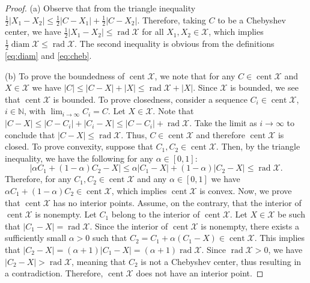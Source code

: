 \documentclass[pdflatex,sn-mathphys-num]{sn-jnl}%
\DeclareMathOperator{\rad}{rad}
\DeclareMathOperator{\cent}{cent}
\DeclareMathOperator{\diam}{diam}
\newcommand{\norm}[1]{\left|#1\right|}
\theoremstyle{thmstyleone}
\begin{document}
\begin{proof}
(a) Observe that from the triangle inequality $\tfrac{1}{2}\norm{X_1-X_2}\leq \tfrac{1}{2}\norm{C-X_1}+\tfrac{1}{2}\norm{C-X_2}$. Therefore, taking $C$ to be a Chebyshev center, we have $\tfrac{1}{2}\norm{X_1-X_2}\leq \rad\mathcal{X}$ for all \mbox{$X_1,X_2\in\mathcal{X}$}, which implies $\tfrac{1}{2}\diam\mathcal{X}\leq\rad\mathcal{X}$. The second inequality is obvious from the definitions \eqref{eq:diam} and \eqref{eq:cheb}. 

(b) To prove the boundedness of $\cent\mathcal{X}$, we note that for any $C\in\cent\mathcal{X}$ and $X\in\mathcal{X}$ we have $\norm{C}\leq \norm{C-X}+\norm{X}\leq \rad\mathcal{X}+\norm{X}$. Since $\mathcal{X}$ is bounded, we see that $\cent\mathcal{X}$ is bounded. To prove closedness, consider a sequence $C_i\in\cent\mathcal{X}$, $i\in\mathbb{N}$, with $\lim_{i\rightarrow\infty} C_i=C$. Let $X\in\mathcal{X}$. Note that $\norm{C-X}\leq\norm{C-C_i}+\norm{C_i-X}\leq \norm{C-C_i}+\rad\mathcal{X}$. Take the limit as $i\rightarrow \infty$ to conclude that $\norm{C-X}\leq \rad\mathcal{X}$. Thus, $C\in\cent\mathcal{X}$ and therefore $\cent\mathcal{X}$ is closed. 
To prove convexity, suppose that $C_1,C_2\in\cent\mathcal{X}$. Then, by the triangle inequality, we have the following for any $\alpha\in[0,1]$:
\begin{equation}
\label{eq:prop:chebuniq-1}
\norm{\alpha C_1+(1-\alpha)C_2-X}\leq\alpha\norm{C_1-X}+(1-\alpha)\norm{C_2-X}\leq\rad\mathcal{X}.
\end{equation}
Therefore, for any $C_1,C_2\in\cent\mathcal{X}$ and any $\alpha\in[0,1]$ we have $\alpha C_1+(1-\alpha)C_2\in\cent\mathcal{X}$, which implies $\cent\mathcal{X}$ is convex. Now, we prove that $\cent\mathcal{X}$ has no interior points. Assume, on the contrary, that the interior of $\cent\mathcal{X}$ is nonempty. Let $C_1$ belong to the interior of $\cent\mathcal{X}$. Let $X\in\mathcal{X}$ be such that $|C_1-X|=\rad\mathcal{X}$. Since the interior of $\cent\mathcal{X}$ is nonempty, there exists a sufficiently small $\alpha>0$ such that $C_2=C_1+\alpha(C_1-X)\in\cent\mathcal{X}$. This implies that $|C_2-X|=(\alpha+1)|C_1-X|=(\alpha+1)\rad\mathcal{X}$. Since $\rad\mathcal{X}>0$, we have $|C_2 - X| > \rad \mathcal{X}$, meaning that $C_2$ is not a Chebyshev center, thus resulting in a contradiction. Therefore, $\cent\mathcal{X}$ does not have an interior point.


\end{proof}
\end{document}
